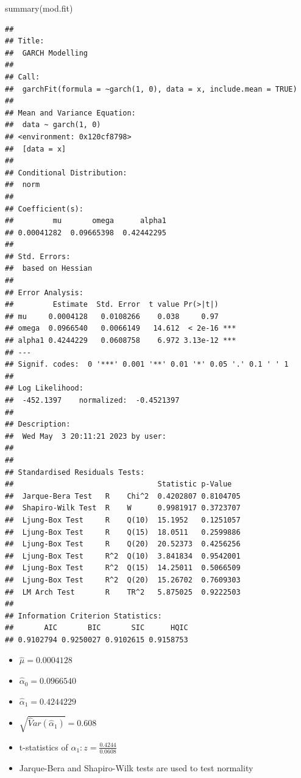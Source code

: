 \documentclass[
]{book}
\newenvironment{Shaded}{\begin{snugshade}}{\end{snugshade}}
\newcommand{\FunctionTok}[1]{\textcolor[rgb]{0.00,0.00,0.00}{#1}}
\newcommand{\NormalTok}[1]{#1}
\theoremstyle{definition}
\theoremstyle{definition}
\theoremstyle{definition}
\theoremstyle{definition}
\theoremstyle{remark}
\begin{document}
\begin{Shaded}
\begin{Highlighting}[]
\FunctionTok{summary}\NormalTok{(mod.fit)}
\end{Highlighting}
\end{Shaded}

\begin{verbatim}
## 
## Title:
##  GARCH Modelling 
## 
## Call:
##  garchFit(formula = ~garch(1, 0), data = x, include.mean = TRUE) 
## 
## Mean and Variance Equation:
##  data ~ garch(1, 0)
## <environment: 0x120cf8798>
##  [data = x]
## 
## Conditional Distribution:
##  norm 
## 
## Coefficient(s):
##         mu       omega      alpha1  
## 0.00041282  0.09665398  0.42442295  
## 
## Std. Errors:
##  based on Hessian 
## 
## Error Analysis:
##         Estimate  Std. Error  t value Pr(>|t|)    
## mu     0.0004128   0.0108266    0.038     0.97    
## omega  0.0966540   0.0066149   14.612  < 2e-16 ***
## alpha1 0.4244229   0.0608758    6.972 3.13e-12 ***
## ---
## Signif. codes:  0 '***' 0.001 '**' 0.01 '*' 0.05 '.' 0.1 ' ' 1
## 
## Log Likelihood:
##  -452.1397    normalized:  -0.4521397 
## 
## Description:
##  Wed May  3 20:11:21 2023 by user:  
## 
## 
## Standardised Residuals Tests:
##                                 Statistic p-Value  
##  Jarque-Bera Test   R    Chi^2  0.4202807 0.8104705
##  Shapiro-Wilk Test  R    W      0.9981917 0.3723707
##  Ljung-Box Test     R    Q(10)  15.1952   0.1251057
##  Ljung-Box Test     R    Q(15)  18.0511   0.2599886
##  Ljung-Box Test     R    Q(20)  20.52373  0.4256256
##  Ljung-Box Test     R^2  Q(10)  3.841834  0.9542001
##  Ljung-Box Test     R^2  Q(15)  14.25011  0.5066509
##  Ljung-Box Test     R^2  Q(20)  15.26702  0.7609303
##  LM Arch Test       R    TR^2   5.875025  0.9222503
## 
## Information Criterion Statistics:
##       AIC       BIC       SIC      HQIC 
## 0.9102794 0.9250027 0.9102615 0.9158753
\end{verbatim}

\begin{itemize}
\item
  \(\hat \mu=0.0004128\)
\item
  \(\hat \alpha_0=0.0966540\)
\item
  \(\hat \alpha_1=0.4244229\)
\item
  \(\sqrt{\hat Var(\hat \alpha_1)}=0.608\)
\item
  t-statistics of \(\alpha_1:z=\frac{0.4244}{0.0608}\)
\item
  Jarque-Bera and Shapiro-Wilk tests are used to test normality
\end{itemize}
\end{document}
